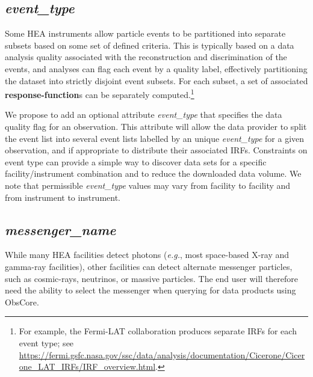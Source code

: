 \documentclass[11pt,a4paper]{ivoa}
\begin{document}
\subsection{{\em event\_type}}
\label{sec:evttype}

Some \gls{HEA} instruments allow particle events to be partitioned into separate subsets based on some set of defined criteria.  This is typically based on a data analysis quality associated with the reconstruction and  discrimination of the events, and analyses can flag each event by a quality label, effectively partitioning the dataset into strictly disjoint event subsets. For each subset, a set of associated {\bf response-function}s can be separately computed.\footnote{For example, the Fermi-LAT collaboration produces separate \glspl{IRF} for each event type; see \url{https://fermi.gsfc.nasa.gov/ssc/data/analysis/documentation/Cicerone/Cicerone_LAT_IRFs/IRF_overview.html}.}

We propose to add an optional attribute {\em event\_type\/} that specifies the data quality flag for an observation. This attribute will allow the data provider to split the event list into several event lists labelled by an unique {\em event\_type\/} for a given observation, and if appropriate to distribute their associated \glspl{IRF}. Constraints on event type can provide a simple way to discover data sets for a specific facility/instrument combination and to reduce the downloaded data volume. We note that permissible {\em event\_type\/} values may vary from facility to facility and from instrument to instrument.


\subsection{{\em messenger\_name}}
\label{sec:messenger}

While many \gls{HEA} facilities detect photons ({\em e.g.\/}, most space-based X-ray and gamma-ray facilities), other facilities can detect alternate messenger particles, such as cosmic-rays, neutrinos, or massive particles.  The end user will therefore need the ability to select the messenger when querying for data products using ObsCore.
\end{document}
